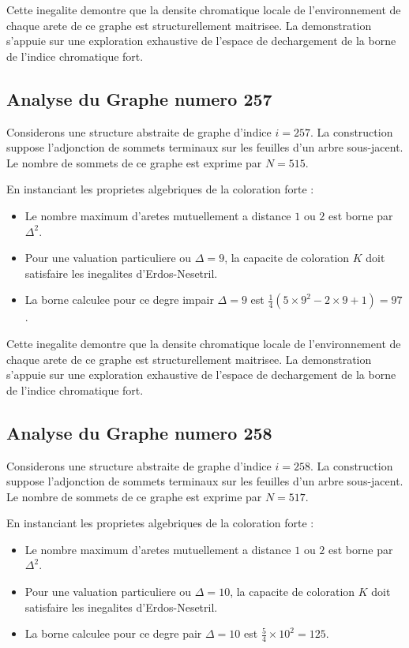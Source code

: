 \documentclass[11pt,a4paper]{article}
\begin{document}
Cette inegalite demontre que la densite chromatique locale de l'environnement de chaque arete de ce graphe est structurellement maitrisee. La demonstration s'appuie sur une exploration exhaustive de l'espace de dechargement de la borne de l'indice chromatique fort.

\subsection{Analyse du Graphe numero 257}
Considerons une structure abstraite de graphe d'indice $i = 257$. La construction suppose l'adjonction de sommets terminaux sur les feuilles d'un arbre sous-jacent. Le nombre de sommets de ce graphe est exprime par $N = 515$.

En instanciant les proprietes algebriques de la coloration forte :
\begin{itemize}
\item Le nombre maximum d'aretes mutuellement a distance $1$ ou $2$ est borne par $\Delta^2$.
\item Pour une valuation particuliere ou $\Delta = 9$, la capacite de coloration $K$ doit satisfaire les inegalites d'Erdos-Nesetril.
\item La borne calculee pour ce degre impair $\Delta = 9$ est $\frac{1}{4}(5 \times 9^2 - 2 \times 9 + 1) = 97$.
\end{itemize}

Cette inegalite demontre que la densite chromatique locale de l'environnement de chaque arete de ce graphe est structurellement maitrisee. La demonstration s'appuie sur une exploration exhaustive de l'espace de dechargement de la borne de l'indice chromatique fort.

\subsection{Analyse du Graphe numero 258}
Considerons une structure abstraite de graphe d'indice $i = 258$. La construction suppose l'adjonction de sommets terminaux sur les feuilles d'un arbre sous-jacent. Le nombre de sommets de ce graphe est exprime par $N = 517$.

En instanciant les proprietes algebriques de la coloration forte :
\begin{itemize}
\item Le nombre maximum d'aretes mutuellement a distance $1$ ou $2$ est borne par $\Delta^2$.
\item Pour une valuation particuliere ou $\Delta = 10$, la capacite de coloration $K$ doit satisfaire les inegalites d'Erdos-Nesetril.
\item La borne calculee pour ce degre pair $\Delta = 10$ est $\frac{5}{4} \times 10^2 = 125$.
\end{itemize}
\end{document}
